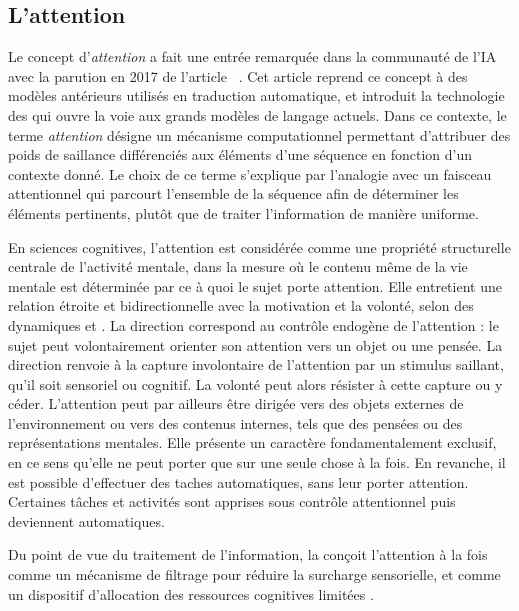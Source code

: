 \subsection{L'attention}

\noindent
Le concept d'\emph{attention} a fait une entrée remarquée dans la communauté de l'IA avec la parution en 2017 de l'article \og {} \fg\  \cite{vaswani_attention_2017}.  
Cet article reprend ce concept à des modèles antérieurs utilisés en traduction automatique, et introduit la technologie des  qui ouvre la voie aux grands modèles de langage actuels.
Dans ce contexte, le terme \emph{attention} désigne un mécanisme computationnel permettant d'attribuer des poids de saillance différenciés aux éléments d'une séquence en fonction d'un contexte donné. 
Le choix de ce terme s’explique par l’analogie avec un faisceau attentionnel qui parcourt l’ensemble de la séquence afin de déterminer les éléments pertinents, plutôt que de traiter l’information de manière uniforme.

En sciences cognitives, l'attention est considérée comme une propriété structurelle centrale de l'activité mentale, dans la mesure où le contenu même de la vie mentale est déterminée par ce à quoi le sujet porte attention.
Elle entretient une relation étroite et bidirectionnelle avec la motivation et la volonté, selon des dynamiques  et .
La direction  correspond au contrôle endogène de l'attention : le sujet peut volontairement orienter son attention vers un objet ou une pensée. 
La direction  renvoie à la capture involontaire de l'attention par un stimulus saillant, qu'il soit sensoriel ou cognitif. 
La volonté peut alors résister à cette capture ou y céder. 
L’attention peut par ailleurs être dirigée vers des objets externes de l’environnement ou vers des contenus internes, tels que des pensées ou des représentations mentales. 
Elle présente un caractère fondamentalement exclusif, en ce sens qu'elle ne peut porter que sur une seule chose à la fois. 
En revanche, il est possible d'effectuer des taches automatiques, sans leur porter attention.
Certaines tâches et activités sont apprises sous contrôle attentionnel puis deviennent automatiques.  

Du point de vue du traitement de l'information, la  conçoit l'attention à la fois comme un mécanisme de filtrage pour réduire la surcharge sensorielle, et comme un dispositif d'allocation des ressources cognitives limitées \cite{murphy_twenty_2016}. 
 

